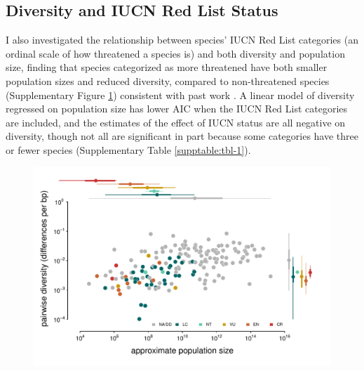 \documentclass[9pt,lineno]{elife}
\begin{document}
\begin{appendixbox}
\section{Diversity and IUCN Red List Status}
\label{app:div-iucn}

I also investigated the relationship between species' IUCN Red List categories
(an ordinal scale of how threatened a species is) and both diversity and
population size, finding that species categorized as more threatened have both
smaller population sizes and reduced diversity, compared to non-threatened
species (Supplementary Figure \ref{figsupp:figure-1-redlist}) consistent with
past work \citep{Spielman2004-mt}. A linear model of diversity regressed on
population size has lower AIC when the IUCN Red List categories are included,
and the estimates of the effect of IUCN status are all negative on diversity,
though not all are significant in part because some categories have three or
fewer species (Supplementary Table \ref{supptable:tbl-1}).


\end{appendixbox}


\begin{figure}
  \includegraphics[width=\textwidth]{diversity_popsize_redlist.pdf}
\label{figsupp:figure-1-redlist}
\end{figure}
\end{document}
